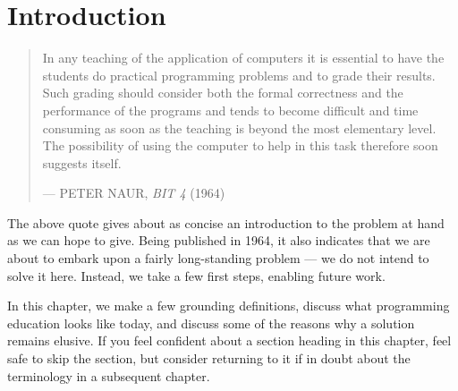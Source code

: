 
\chapter{Introduction}

\begin{quotation}

\footnotesize\sffamily\itshape

\begin{flushright}

In any teaching of the application of computers it is essential to have the
students do practical programming problems and to grade their results. Such
grading should consider both the formal correctness and the performance of the
programs and tends to become difficult and time consuming as soon as the
teaching is beyond the most elementary level.  The possibility of using the
computer to help in this task therefore soon suggests itself.

\smallbreak

\upshape

--- PETER NAUR, {\itshape BIT 4} (1964)

\end{flushright}

\end{quotation}

The above quote gives about as concise an introduction to the problem at hand
as we can hope to give. Being published in 1964, it also indicates that we are
about to embark upon a fairly long-standing problem --- we do not intend to
solve it here. Instead, we take a few first steps, enabling future work.

In this chapter, we make a few grounding definitions, discuss what programming
education looks like today, and discuss some of the reasons why a solution
remains elusive. If you feel confident about a section heading in this chapter,
feel safe to skip the section, but consider returning to it if in doubt about
the terminology in a subsequent chapter.










